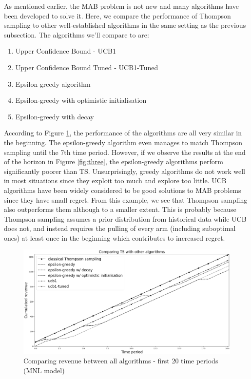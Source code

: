 \documentclass[a4paper]{article}
\begin{document}
As mentioned earlier, the MAB problem is not new and many algorithms have been developed to solve it. Here, we compare the performance of Thompson sampling to other well-established algorithms in the same setting as the previous subsection. The algorithms we'll compare to are:
\begin{enumerate}
	\item Upper Confidence Bound - UCB1
	\item Upper Confidence Bound Tuned - UCB1-Tuned
	\item Epsilon-greedy algorithm
	\item Epsilon-greedy with optimistic initialisation
	\item Epsilon-greedy with decay	
\end{enumerate}
According to Figure \ref{fig:two}, the performance of the algorithms are all very similar in the beginning. The epsilon-greedy algorithm even manages to match Thompson sampling until the 7th time period. However, if we observe the results at the end of the horizon in Figure \ref{fig:three}, the epsilon-greedy algorithms perform significantly poorer than TS. Unsurprisingly, greedy algorithms do not work well in most situations since they exploit too much and explore too little. UCB algorithms have been widely considered to be good solutions to MAB problems since they have small regret. From this example, we see that Thompson sampling also outperforms them although to a smaller extent. This is probably because Thompson sampling assumes a prior distribution from historical data while UCB does not, and instead requires the pulling of every arm (including suboptimal ones) at least once in the beginning which contributes to increased regret.
\vfill
\begin{figure}[h]
	\centering
	\includegraphics[width=1.03\textwidth]{Figure_1-3.png}
	\caption{\label{fig:two}Comparing revenue between all algorithms - first 20 time periods (MNL model)}
\end{figure}
\end{document}
